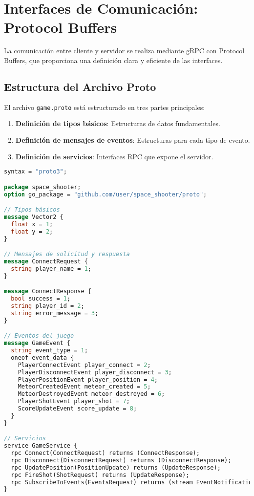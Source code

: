 \documentclass[11pt,letterpaper]{article}
\begin{document}
\section{Interfaces de Comunicación: Protocol Buffers}

La comunicación entre cliente y servidor se realiza mediante gRPC con Protocol Buffers, que proporciona una definición clara y eficiente de las interfaces.

\subsection{Estructura del Archivo Proto}

El archivo \texttt{game.proto} está estructurado en tres partes principales:

\begin{enumerate}
    \item \textbf{Definición de tipos básicos}: Estructuras de datos fundamentales.
    \item \textbf{Definición de mensajes de eventos}: Estructuras para cada tipo de evento.
    \item \textbf{Definición de servicios}: Interfaces RPC que expone el servidor.
\end{enumerate}

\begin{lstlisting}[language=proto, caption=Estructura del archivo game.proto]
syntax = "proto3";

package space_shooter;
option go_package = "github.com/user/space_shooter/proto";

// Tipos básicos
message Vector2 {
  float x = 1;
  float y = 2;
}

// Mensajes de solicitud y respuesta
message ConnectRequest {
  string player_name = 1;
}

message ConnectResponse {
  bool success = 1;
  string player_id = 2;
  string error_message = 3;
}

// Eventos del juego
message GameEvent {
  string event_type = 1;
  oneof event_data {
    PlayerConnectEvent player_connect = 2;
    PlayerDisconnectEvent player_disconnect = 3;
    PlayerPositionEvent player_position = 4;
    MeteorCreatedEvent meteor_created = 5;
    MeteorDestroyedEvent meteor_destroyed = 6;
    PlayerShotEvent player_shot = 7;
    ScoreUpdateEvent score_update = 8;
  }
}

// Servicios
service GameService {
  rpc Connect(ConnectRequest) returns (ConnectResponse);
  rpc Disconnect(DisconnectRequest) returns (DisconnectResponse);
  rpc UpdatePosition(PositionUpdate) returns (UpdateResponse);
  rpc FireShot(ShotRequest) returns (UpdateResponse);
  rpc SubscribeToEvents(EventsRequest) returns (stream EventNotification);
}
\end{lstlisting}
\end{document}
